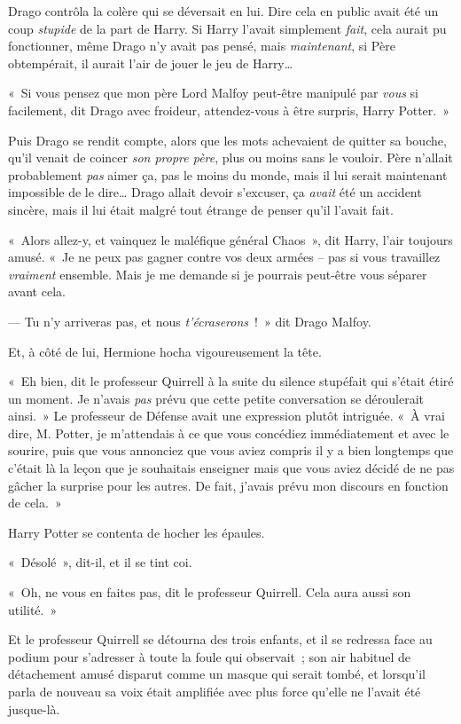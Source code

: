 Drago contrôla la colère qui se déversait en lui. Dire cela en public avait été un coup \emph{stupide} de la part de Harry. Si Harry l'avait simplement \emph{fait}, cela aurait pu fonctionner, même Drago n'y avait pas pensé, mais \emph{maintenant}, si Père obtempérait, il aurait l'air de jouer le jeu de Harry…

«~Si vous pensez que mon père Lord Malfoy peut-être manipulé par \emph{vous} si facilement, dit Drago avec froideur, attendez-vous à être surpris, Harry Potter.~»

Puis Drago se rendit compte, alors que les mots achevaient de quitter sa bouche, qu'il venait de coincer \emph{son propre père}, plus ou moins sans le vouloir. Père n'allait probablement \emph{pas} aimer ça, pas le moins du monde, mais il lui serait maintenant impossible de le dire… Drago allait devoir s'excuser, ça \emph{avait} été un accident sincère, mais il lui était malgré tout étrange de penser qu'il l'avait fait.

«~Alors allez-y, et vainquez le maléfique général Chaos~», dit Harry, l'air toujours amusé. «~Je ne peux pas gagner contre vos deux armées -- pas si vous travaillez \emph{vraiment} ensemble. Mais je me demande si je pourrais peut-être vous séparer avant cela.

--- Tu n'y arriveras pas, et nous \emph{t'écraserons}~!~» dit Drago Malfoy.

Et, à côté de lui, Hermione hocha vigoureusement la tête.

«~Eh bien, dit le professeur Quirrell à la suite du silence stupéfait qui s'était étiré un moment. Je n'avais \emph{pas} prévu que cette petite conversation se déroulerait ainsi.~» Le professeur de Défense avait une expression plutôt intriguée. «~À vrai dire, M. Potter, je m'attendais à ce que vous concédiez immédiatement et avec le sourire, puis que vous annonciez que vous aviez compris il y a bien longtemps que c'était là la leçon que je souhaitais enseigner mais que vous aviez décidé de ne pas gâcher la surprise pour les autres. De fait, j'avais prévu mon discours en fonction de cela.~»

Harry Potter se contenta de hocher les épaules.

«~Désolé~», dit-il, et il se tint coi.

«~Oh, ne vous en faites pas, dit le professeur Quirrell. Cela aura aussi son utilité.~»

Et le professeur Quirrell se détourna des trois enfants, et il se redressa face au podium pour s'adresser à toute la foule qui observait~; son air habituel de détachement amusé disparut comme un masque qui serait tombé, et lorsqu'il parla de nouveau sa voix était amplifiée avec plus force qu'elle ne l'avait été jusque-là.

